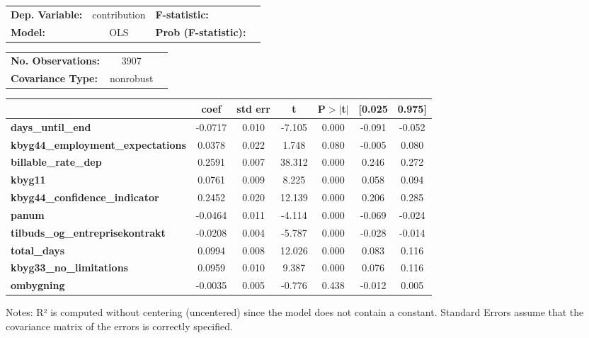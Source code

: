 \begin{center}
\begin{tabular}{lclc}
\toprule
\textbf{Dep. Variable:}                   &  contribution & \textbf{  F-statistic:       }  \\
\textbf{Model:}                           &      OLS      & \textbf{  Prob (F-statistic):}  \\
\bottomrule
\end{tabular}
\begin{tabular}{lcl}
\textbf{No. Observations:}                &       3907    & \textbf{                     }  \\
\textbf{Covariance Type:}                 &   nonrobust   & \textbf{                     }  \\
\bottomrule
\end{tabular}
\begin{tabular}{lcccccc}
                                          & \textbf{coef} & \textbf{std err} & \textbf{t} & \textbf{P$> |$t$|$} & \textbf{[0.025} & \textbf{0.975]}  \\
\midrule
\textbf{days\_until\_end}                 &      -0.0717  &        0.010     &    -7.105  &         0.000        &       -0.091    &       -0.052     \\
\textbf{kbyg44\_employment\_expectations} &       0.0378  &        0.022     &     1.748  &         0.080        &       -0.005    &        0.080     \\
\textbf{billable\_rate\_dep}              &       0.2591  &        0.007     &    38.312  &         0.000        &        0.246    &        0.272     \\
\textbf{kbyg11}                           &       0.0761  &        0.009     &     8.225  &         0.000        &        0.058    &        0.094     \\
\textbf{kbyg44\_confidence\_indicator}    &       0.2452  &        0.020     &    12.139  &         0.000        &        0.206    &        0.285     \\
\textbf{panum}                            &      -0.0464  &        0.011     &    -4.114  &         0.000        &       -0.069    &       -0.024     \\
\textbf{tilbuds\_og\_entreprisekontrakt}  &      -0.0208  &        0.004     &    -5.787  &         0.000        &       -0.028    &       -0.014     \\
\textbf{total\_days}                      &       0.0994  &        0.008     &    12.026  &         0.000        &        0.083    &        0.116     \\
\textbf{kbyg33\_no\_limitations}          &       0.0959  &        0.010     &     9.387  &         0.000        &        0.076    &        0.116     \\
\textbf{ombygning}                        &      -0.0035  &        0.005     &    -0.776  &         0.438        &       -0.012    &        0.005     \\
\bottomrule
\end{tabular}
\end{center}

Notes: \newline
 [1] R² is computed without centering (uncentered) since the model does not contain a constant. \newline
 [2] Standard Errors assume that the covariance matrix of the errors is correctly specified.